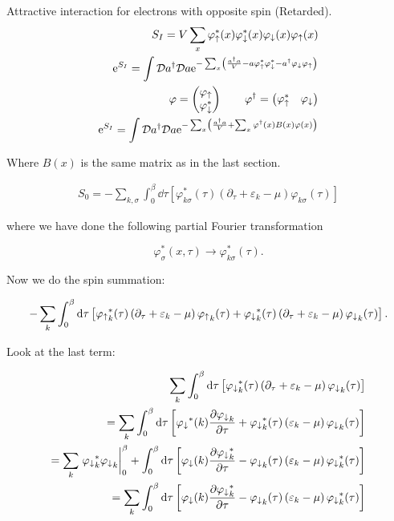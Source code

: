 Attractive interaction for electrons with opposite spin (Retarded). \\ 
\begin{align*}
    S_I = V \sum_x \varphi_\uparrow^*(x) \varphi_\downarrow^* (x) \varphi_\downarrow(x) \varphi_\uparrow(x) \\ 
    \mathrm{e}^{S_I} = \int \mathcal{D}a^{\dagger} \mathcal{D} a \mathrm{e}^{-\sum_x \left( \frac{a^{\dagger} a}{V} - a \varphi_\uparrow^* \varphi_\downarrow^* - a^{\dagger} \varphi_\downarrow \varphi_\uparrow \right)} \\ 
    \varphi = \begin{pmatrix} \varphi_\uparrow \\ \varphi_\downarrow^* \end{pmatrix} \quad \quad \varphi^\dagger = \begin{pmatrix} \varphi_\uparrow^* & \varphi_\downarrow \end{pmatrix} \\ 
    \mathrm{e}^{S_I} = \int \mathcal{D}a^{\dagger} \mathcal{D} a \mathrm{e}^{-\sum_x \left( \frac{a^{\dagger} a}{V} + \sum_x \varphi^\dagger (x) B(x) \varphi(x) \right)}
\end{align*}

Where $B(x)$ is the same matrix as in the last section. 

\begin{align*}
    S_0 = -\sum_{k, \sigma} \int_{0}^{\beta} \dd \tau \left[ \varphi_{k\sigma} ^* (\tau) \left( \partial_\tau + \varepsilon_k - \mu \right) \varphi_{k \sigma} (\tau) \right] 
\end{align*}

where we have done the following partial Fourier transformation 

\begin{equation*}
    \varphi_\sigma^*(x,\tau) \to \varphi^*_{k \sigma}(\tau).
\end{equation*}

Now we do the spin summation: 

\begin{align*}
    -\sum_k \int_{0}^{\beta} \dd \tau \left[ {\varphi_\uparrow}_{k}^* (\tau) \left( \partial_\tau + \varepsilon_k - \mu \right) {\varphi_\uparrow}_{k} (\tau) + {\varphi_\downarrow}_{k}^* (\tau) \left( \partial_\tau + \varepsilon_k - \mu \right) {\varphi_\downarrow}_{k} (\tau)\right].
\end{align*}

Look at the last term: 

\begin{align*}
    \sum_k \int_{0}^{\beta} \dd \tau \left[{\pd}_{k} ^* (\tau) \left( \partial_\tau + \varepsilon_k - \mu \right) {\pd}_{k} (\tau)\right] \\ 
    = \sum_k \int_{0}^{\beta} \dd \tau \left[{\pd}^*(k) \pdv{{\pd}_k}{\tau} + {\pd}_{k} ^* (\tau) \left(\varepsilon_k - \mu \right) {\pd}_{k} (\tau)\right] \\ 
    = \sum_k \eval{{\pd}_k^* {\pd}_k}_0 ^\beta + \int_{0}^{\beta} \dd \tau \left[{\pd}(k) \pdv{{\pd}^*_k}{\tau} - {\pd}_{k} (\tau) \left(\varepsilon_k - \mu \right) {\pd}_{k}^* (\tau)\right] \\ 
    = \sum_k \int_{0}^{\beta} \dd \tau \left[{\pd}(k) \pdv{{\pd}^*_k}{\tau} - {\pd}_{k} (\tau) \left(\varepsilon_k - \mu \right) {\pd}_{k}^* (\tau)\right]
\end{align*}

